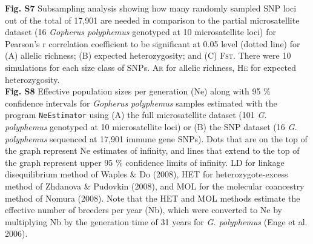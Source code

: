 \documentclass[english]{article}\usepackage[]{graphicx}\usepackage[]{color}
\begin{document}
\textbf{Fig. S7} Subsampling analysis showing how many randomly sampled SNP loci out of the total of 17,901 are needed in comparison to the partial microsatellite dataset (16 \textit{Gopherus polyphemus} genotyped at 10 microsatellite loci) for Pearson's r correlation coefficient to be significant at 0.05 level (dotted line) for (A) allelic richness; (B) expected heterozygosity; and (C) \textsc{Fst}. There were 10 simulations for each size class of SNPs. \textsc{Ar} for allelic richness, \textsc{He} for expected heterozygosity.\\
\textbf{Fig. S8} Effective population sizes per generation (Ne) along with 95 \% confidence intervals for \textit{Gopherus polyphemus} samples estimated with the program \texttt{NeEstimator} using (A) the full microsatellite dataset (101 \textit{G. polyphemus} genotyped at 10 microsatellite loci) or (B) the SNP dataset (16 \textit{G. polyphemus} sequenced at 17,901 immune gene SNPs). Dots that are on the top of the graph represent Ne estimates of infinity, and lines that extend to the top of the graph represent upper 95 \% confidence limits of infinity. LD for linkage disequilibrium method of Waples \& Do (2008), HET for heterozygote-excess method of Zhdanova \& Pudovkin (2008), and MOL for the molecular coancestry method of Nomura (2008). Note that the HET and MOL methods estimate the effective number of breeders per year (Nb), which were converted to Ne by multiplying Nb by the generation time of 31 years for \textit{G. polyphemus} (Enge et al. 2006).\\



\pagebreak
\singlespacing
\end{document}
